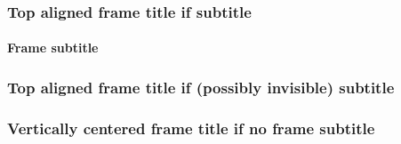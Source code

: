 \documentclass[9pt]{beamer}
\begin{document}
\begin{frame}
  \frametitle{Top aligned frame title if subtitle}
  \framesubtitle{Frame subtitle}
\end{frame}

\begin{frame}
  \frametitle{Top aligned frame title if (possibly invisible) subtitle}
  \framesubtitle{\mbox{}}
\end{frame}

\begin{frame}
  \frametitle{Vertically centered frame title if no frame subtitle}
\end{frame}
\end{document}
